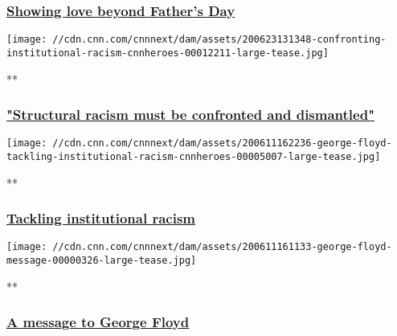 \hypertarget{showing-love-beyond-fathers-day}{%
\subsubsection{\texorpdfstring{\href{/videos/tv/2020/06/23/supporting-young-black-chicago-fathers-cnnheroes.cnn}{Showing
love beyond Father's
Day}}{Showing love beyond Father's Day}}\label{showing-love-beyond-fathers-day}}

\href{/videos/tv/2020/06/23/confronting-institutional-racism-cnnheroes.cnn}{}

\texttt{[image: //cdn.cnn.com/cnnnext/dam/assets/200623131348-confronting-institutional-racism-cnnheroes-00012211-large-tease.jpg]}

**

\hypertarget{structural-racism-must-be-confronted-and-dismantled}{%
\subsubsection{\texorpdfstring{\href{/videos/tv/2020/06/23/confronting-institutional-racism-cnnheroes.cnn}{"Structural
racism must be confronted and
dismantled"}}{"Structural racism must be confronted and dismantled"}}\label{structural-racism-must-be-confronted-and-dismantled}}

\href{/videos/tv/2020/06/11/george-floyd-tackling-institutional-racism-cnnheroes.cnn}{}

\texttt{[image: //cdn.cnn.com/cnnnext/dam/assets/200611162236-george-floyd-tackling-institutional-racism-cnnheroes-00005007-large-tease.jpg]}

**

\hypertarget{tackling-institutional-racism}{%
\subsubsection{\texorpdfstring{\href{/videos/tv/2020/06/11/george-floyd-tackling-institutional-racism-cnnheroes.cnn}{Tackling
institutional
racism}}{Tackling institutional racism}}\label{tackling-institutional-racism}}

\href{/videos/tv/2020/06/11/george-floyd-message.cnn}{}

\texttt{[image: //cdn.cnn.com/cnnnext/dam/assets/200611161133-george-floyd-message-00000326-large-tease.jpg]}

**

\hypertarget{a-message-to-george-floyd}{%
\subsubsection{\texorpdfstring{\href{/videos/tv/2020/06/11/george-floyd-message.cnn}{A
message to George
Floyd}}{A message to George Floyd}}\label{a-message-to-george-floyd}}

